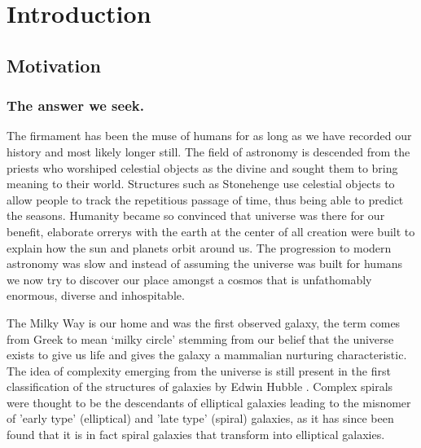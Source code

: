 
\chapter{Introduction} %
\label{Chapter:Intro}

\section{Motivation}
\label{sec:Motivation}

\subsection{The answer we seek.}
The firmament has been the muse of humans for as long as we have recorded our history and most likely longer still. The field of astronomy is descended from the priests who worshiped celestial objects as the divine and sought them to bring meaning to their world. Structures such as Stonehenge use celestial objects to allow people to track the repetitious passage of time, thus being able to predict the seasons. Humanity became so convinced that universe was there for our benefit, elaborate orrerys with the earth at the center of all creation were built to explain how the sun and planets orbit around us. The progression to modern astronomy was slow and instead of assuming the universe was built for humans we now try to discover our place amongst a cosmos that is unfathomably enormous, diverse and inhospitable. 

The Milky Way is our home and was the first observed galaxy, the term comes from Greek to mean `milky circle' stemming from our belief that the universe exists to give us life and gives the galaxy a mammalian nurturing characteristic. The idea of complexity emerging from the universe is still present in the first classification of the structures of galaxies by Edwin Hubble \citep{Hubble1926Extra-galacticNebulae.,Hubble1927TheNebulae}. Complex spirals were thought to be the descendants of elliptical galaxies leading to the misnomer of 'early type' (elliptical) and 'late type' (spiral) galaxies, as it has since been found that it is in fact spiral galaxies that transform into elliptical galaxies.

